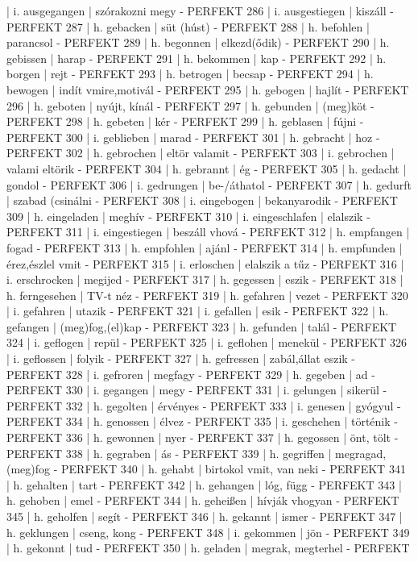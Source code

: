 \documentclass{article}
\newenvironment{exmp}{\verbatim}{\endverbatim}
\begin{document}
\begin{exmp}
285 | i. ausgegangen | szórakozni megy - PERFEKT
286 | i. ausgestiegen | kiszáll - PERFEKT
287 | h. gebacken | süt (húst) - PERFEKT
288 | h. befohlen | parancsol - PERFEKT
289 | h. begonnen | elkezd(ődik) - PERFEKT
290 | h. gebissen | harap - PERFEKT
291 | h. bekommen | kap - PERFEKT
292 | h. borgen | rejt - PERFEKT
293 | h. betrogen | becsap - PERFEKT
294 | h. bewogen | indít vmire,motivál - PERFEKT
295 | h. gebogen | hajlít - PERFEKT
296 | h. geboten | nyújt, kínál - PERFEKT
297 | h. gebunden | (meg)köt - PERFEKT
298 | h. gebeten | kér - PERFEKT
299 | h. geblasen | fújni - PERFEKT
300 | i. geblieben | marad - PERFEKT
301 | h. gebracht | hoz - PERFEKT
302 | h. gebrochen | eltör valamit - PERFEKT
303 | i. gebrochen | valami eltörik - PERFEKT
304 | h. gebrannt | ég - PERFEKT
305 | h. gedacht | gondol - PERFEKT
306 | i. gedrungen | be-/áthatol - PERFEKT
307 | h. gedurft | szabad (csinálni - PERFEKT
308 | i. eingebogen | bekanyarodik - PERFEKT
309 | h. eingeladen | meghív - PERFEKT
310 | i. eingeschlafen | elalszik - PERFEKT
311 | i. eingestiegen | beszáll vhová - PERFEKT
312 | h. empfangen | fogad - PERFEKT
313 | h. empfohlen | ajánl - PERFEKT
314 | h. empfunden | érez,észlel vmit - PERFEKT
315 | i. erloschen | elalszik a tűz - PERFEKT
316 | i. erschrocken | megijed - PERFEKT
317 | h. gegessen | eszik - PERFEKT
318 | h. ferngesehen | TV-t néz - PERFEKT
319 | h. gefahren | vezet - PERFEKT
320 | i. gefahren | utazik - PERFEKT
321 | i. gefallen | esik - PERFEKT
322 | h. gefangen | (meg)fog,(el)kap - PERFEKT
323 | h. gefunden | talál - PERFEKT
324 | i. geflogen | repül - PERFEKT
325 | i. geflohen | menekül - PERFEKT
326 | i. geflossen | folyik - PERFEKT
327 | h. gefressen | zabál,állat eszik - PERFEKT
328 | i. gefroren | megfagy - PERFEKT
329 | h. gegeben | ad - PERFEKT
330 | i. gegangen | megy - PERFEKT
331 | i. gelungen | sikerül - PERFEKT
332 | h. gegolten | érvényes - PERFEKT
333 | i. genesen | gyógyul - PERFEKT
334 | h. genossen | élvez - PERFEKT
335 | i. geschehen | történik - PERFEKT
336 | h. gewonnen | nyer - PERFEKT
337 | h. gegossen | önt, tölt - PERFEKT
338 | h. gegraben | ás - PERFEKT
339 | h. gegriffen | megragad, (meg)fog - PERFEKT
340 | h. gehabt | birtokol vmit, van neki - PERFEKT
341 | h. gehalten | tart - PERFEKT
342 | h. gehangen | lóg, függ - PERFEKT
343 | h. gehoben | emel - PERFEKT
344 | h. geheißen | hívják vhogyan - PERFEKT
345 | h. geholfen | segít - PERFEKT
346 | h. gekannt | ismer - PERFEKT
347 | h. geklungen | cseng, kong - PERFEKT
348 | i. gekommen | jön - PERFEKT
349 | h. gekonnt | tud - PERFEKT
350 | h. geladen | megrak, megterhel - PERFEKT

\end{exmp}
\end{document}

